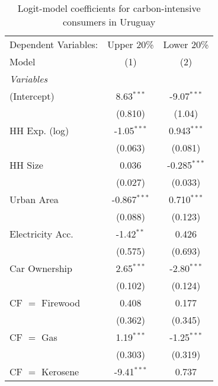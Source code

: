 
\begin{table}[htbp!]
   \centering
   \small
   \begin{adjustbox}{width = 1\textwidth, max height = 0.95\textheight, center}
      \begin{threeparttable}[b]
         \caption{\label{tab:Logit_1_URY} Logit-model coefficients for carbon-intensive consumers in Uruguay}
         \begin{tabular}{lcc}
            \tabularnewline \midrule \midrule
            Dependent Variables: & Upper 20\%     & Lower 20\%\\   
            Model                & (1)            & (2)\\  
            \midrule
            \emph{Variables}\\
            (Intercept)          & 8.63$^{***}$   & -9.07$^{***}$\\   
                                 & (0.810)        & (1.04)\\   
            HH Exp. (log)        & -1.05$^{***}$  & 0.943$^{***}$\\   
                                 & (0.063)        & (0.081)\\   
            HH Size              & 0.036          & -0.285$^{***}$\\   
                                 & (0.027)        & (0.033)\\   
            Urban Area           & -0.867$^{***}$ & 0.710$^{***}$\\   
                                 & (0.088)        & (0.123)\\   
            Electricity Acc.     & -1.42$^{**}$   & 0.426\\   
                                 & (0.575)        & (0.693)\\   
            Car Ownership        & 2.65$^{***}$   & -2.80$^{***}$\\   
                                 & (0.102)        & (0.124)\\   
            CF $=$ Firewood      & 0.408          & 0.177\\   
                                 & (0.362)        & (0.345)\\   
            CF $=$ Gas           & 1.19$^{***}$   & -1.25$^{***}$\\   
                                 & (0.303)        & (0.319)\\   
            CF $=$ Kerosene      & -9.41$^{***}$  & 0.737\\   

\end{tabular}
\end{threeparttable}
\end{adjustbox}
\end{table}
